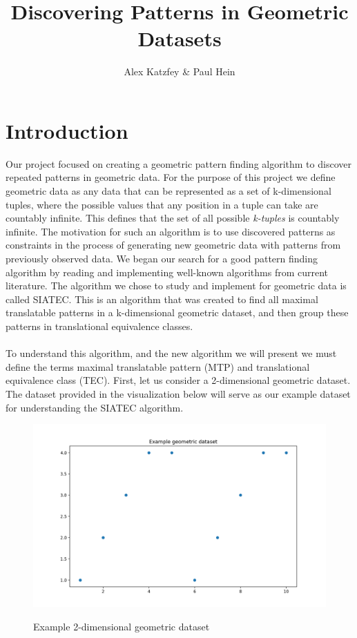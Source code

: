 \documentclass[12pt]{article}
\begin{document}
\title{Discovering Patterns in Geometric Datasets}
\author{Alex Katzfey \& Paul Hein}
\maketitle

\section{Introduction}
Our project focused on creating a geometric pattern finding algorithm to discover repeated patterns in geometric data. For the purpose of this project we define geometric data as any data that can be represented as a set of k-dimensional tuples, where the possible values that any position in a tuple can take are countably infinite. This defines that the set of all possible \textit{k-tuples} is countably infinite. The motivation for such an algorithm is to use discovered patterns as constraints in the process of generating new geometric data with patterns from previously observed data.  We began our search for a good pattern finding algorithm by reading and implementing well-known algorithms from current literature. The algorithm we chose to study and implement for geometric data is called SIATEC. This is an algorithm that was created to find all maximal translatable patterns in a k-dimensional geometric dataset, and then group these patterns in translational equivalence classes.
\\
\\To understand this algorithm, and the new algorithm we will present we must define the terms maximal translatable pattern (MTP) and translational equivalence class (TEC). First, let us consider a 2-dimensional geometric dataset. The dataset provided in the visualization below will serve as our example dataset for understanding the SIATEC algorithm.

\FloatBarrier
\begin{figure}[!htbp]
  \centering
  \includegraphics[width=.55\textwidth]{orig_data_example}
  \label{fig:figure1}
  \caption{Example 2-dimensional geometric dataset}
\end{figure}
\FloatBarrier
\end{document}
